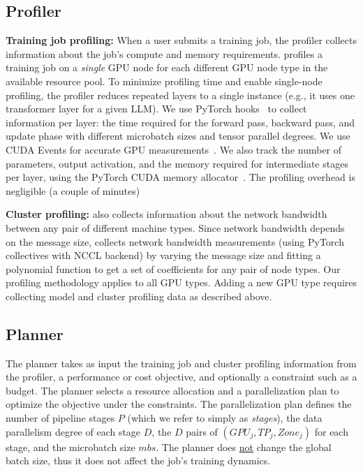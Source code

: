 
\subsection{\sailor Profiler}\label{profiler}

\textbf{Training job profiling:} When a user submits a training job, the \sailor profiler collects information about the job's compute and memory requirements. \sailor profiles a training job on a \textit{single} GPU node for each different GPU node type in the available resource pool. To minimize profiling time and enable single-node profiling, the profiler reduces repeated layers to a single instance (e.g., it uses one transformer layer for a given LLM).  We use PyTorch hooks~\cite{torch_hooks} to collect information per layer: the time required for the forward pass, backward pass, and update phase with different microbatch sizes and tensor parallel degrees. We use CUDA Events for accurate GPU measurements~\cite{torch_cuda_events}. We also track the number of parameters, output activation, and the memory required for intermediate stages per layer, using the PyTorch CUDA memory allocator~\cite{torch_cuda_mem_alloc}. The profiling overhead is negligible (a couple of minutes)  

\textbf{Cluster profiling:} \sailor also collects information about the network bandwidth between any pair of different machine types. Since network bandwidth depends on the message size, \sailor collects network bandwidth measurements (using PyTorch collectives with NCCL backend) by varying the message size and fitting a polynomial function to get a set of coefficients for any pair of node types.
Our profiling methodology applies to all GPU types.
Adding a new GPU type requires collecting model and cluster profiling data as described above.


\subsection{\sailor Planner}\label{planner}

The \sailor planner takes as input the training job and cluster profiling information from the profiler, a performance or cost objective, and optionally a constraint such as a budget. The planner selects a resource allocation and a parallelization plan to optimize the objective under the constraints.
The parallelization plan defines the number of pipeline stages $P$ (which we refer to simply as \textit{stages}), the data parallelism degree of each stage $D$, the $D$ pairs of $(GPU_j, TP_j, Zone_j)$ for each stage, and the microbatch size $mbs$. The \sailor planner does \underline{not} change the global batch size, thus it does not affect the job's training dynamics. 


